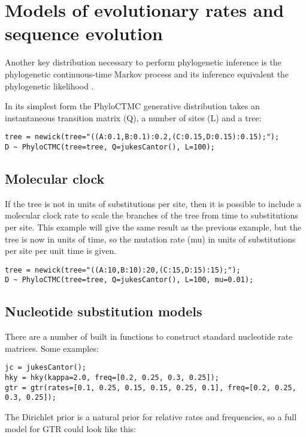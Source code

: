 \documentclass[oneside]{article}
\begin{document}
\section{Models of evolutionary rates and sequence evolution}

Another key distribution necessary to perform phylogenetic inference
is the phylogenetic continuous-time Markov process and its inference
equivalent the phylogenetic likelihood \cite{felsenstein1981}.

In its simplest form the PhyloCTMC generative
distribution takes an instantaneous transition matrix (Q), a number of sites (L) and a tree:

\begin{verbatim}
tree = newick(tree="((A:0.1,B:0.1):0.2,(C:0.15,D:0.15):0.15);");
D ~ PhyloCTMC(tree=tree, Q=jukesCantor(), L=100);
\end{verbatim}

\subsection{ Molecular clock}

If the tree is not in units of substitutions per site, then it is possible to include a molecular clock rate
to scale the branches of the tree from time to substitutions per site. This example will give the same
result as the previous example, but the tree is now in units of time, so the mutation rate (mu) in units of
substitutions per site per unit time is given.

\begin{verbatim}
tree = newick(tree="((A:10,B:10):20,(C:15,D:15):15);");
D ~ PhyloCTMC(tree=tree, Q=jukesCantor(), L=100, mu=0.01);
\end{verbatim}

\subsection{ Nucleotide substitution models}

There are a number of built in functions to construct standard nucleotide rate matrices. Some examples:

\begin{verbatim}
jc = jukesCantor();
hky = hky(kappa=2.0, freq=[0.2, 0.25, 0.3, 0.25]);
gtr = gtr(rates=[0.1, 0.25, 0.15, 0.15, 0.25, 0.1], freq=[0.2, 0.25, 0.3, 0.25]);
\end{verbatim}

The Dirichlet prior is a natural prior for relative rates and frequencies, so a full model for GTR could
look like this:
\end{document}
